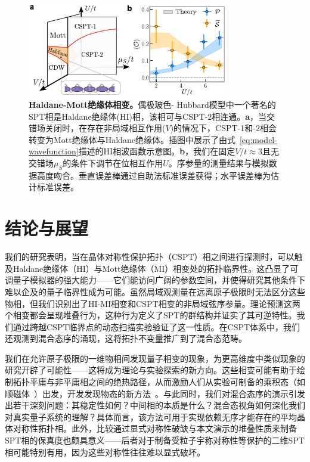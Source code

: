 \documentclass[preprint,superscriptaddress,floatfix,nofootinbib]{revtex4-2}
\begin{document}
\begin{figure}
    \centering
    \includegraphics[width=247pt]{figures/Fig_Haldane_V3.pdf}
    \caption{\textbf{Haldane-Mott绝缘体相变。}偶极玻色- Hubbard模型中一个著名的SPT相是Haldane绝缘体(HI)相，该相可与CSPT-2相连通。\textbf{a}，当交错场关闭时，在存在非局域相互作用($V$)的情况下，CSPT-1和-2相会转变为Mott绝缘体与Haldane绝缘体。插图中展示了由式~\eqref{eq:model-wavefunction}描述的HI相波函数示意图。\textbf{b}，我们在固定$V/t\approx3$且无交错场$\mu_S$的条件下调节在位相互作用$U$。序参量的测量结果与模拟数据高度吻合。垂直误差棒通过自助法标准误差获得；水平误差棒为估计标准误差。}
    \label{fig: HI}
\end{figure}
\section{结论与展望}

我们的研究表明，当在晶体对称性保护拓扑（CSPT）相之间进行探测时，可以触及Haldane绝缘体（HI）与Mott绝缘体（MI）相变处的拓扑临界性。这凸显了可调量子模拟器的强大能力——它们能访问广阔的参数空间，并使得研究其他条件下难以企及的量子临界性成为可能。虽然局域观测量在远离原子极限时无法区分这些物相，但我们识别出了HI-MI相变和CSPT相变的非局域弦序参量。理论预测这两个相变都会呈现堆叠行为，这种行为定义了SPT的群结构并证实了其可逆特性。我们通过跨越CSPT临界点的动态扫描实验验证了这一性质。在CSPT体系中，我们还观测到混合态序的涌现，这将拓扑不变量推广到了混合态范畴。

我们在允许原子极限的一维物相间发现量子相变的现象，为更高维度中类似现象的研究开辟了可能性——这将成为理论与实验探索的新方向。这些相变可能有助于绘制拓扑平庸与非平庸相之间的绝热路径，从而激励人们从实验可制备的乘积态（如顺磁体~\cite{Scholl2021, Ebadi2021}）出发，开发发现物态的新方法~\cite{Semeghini2021}。与此同时，我们对混合态序的演示引发出若干深刻问题：其稳定性如何？中间相的本质是什么？混合态视角如何深化我们对真实量子系统的理解？具体而言，该方法可用于实现依赖无序才能存在的平均晶体对称性拓扑相\cite{Ma23_b,intrinsicACSPT}。此外，比较通过显式对称性破缺与本文演示的堆叠性质来制备SPT相的保真度也颇具意义——后者对于制备受粒子宇称对称性等保护的二维SPT相可能特别有用\cite{LevinGu}，因为这些对称性往往难以显式破坏。
\end{document}
